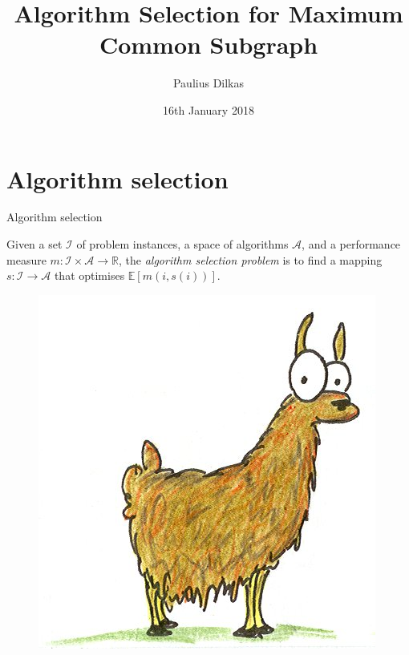 \documentclass{beamer}
\author{Paulius Dilkas}
\title{Algorithm Selection for Maximum Common Subgraph}
\date{16th January 2018}
\institute{School of Computing Science, University of Glasgow}
\begin{document}
\maketitle


\section{Algorithm selection}
\begin{frame}{Algorithm selection}
  \begin{definition}
    Given a set $\mathcal{I}$ of problem instances, a space of algorithms
    $\mathcal{A}$, and a performance measure $m \colon \mathcal{I} \times
    \mathcal{A} \to \mathbb{R}$, the \emph{algorithm selection problem} is to
    find a mapping $s \colon \mathcal{I} \to \mathcal{A}$ that optimises
    $\mathbb{E}[m(i, s(i))]$.
  \end{definition}
  \pause
  \begin{figure}
    \centering
    \includegraphics[scale=0.5]{llama.jpg}
  \end{figure}
\end{frame}
\end{document}
